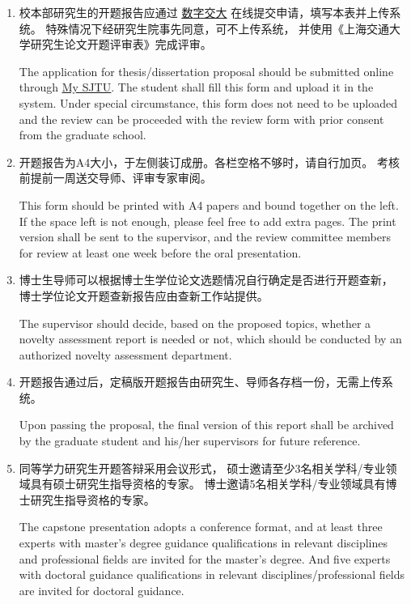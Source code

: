 \documentclass[a4paper,zihao=-4,AutoFakeBold]{ctexart}
\begin{document}
\begin{enumerate}[parsep=.5\baselineskip]
    \fangsong
    \item 校本部研究生的开题报告应通过%
          \href{http://my.sjtu.edu.cn/}{\color{blue}\underline{数字交大}}%
          在线提交申请，填写本表并上传系统。
          特殊情况下经研究生院事先同意，可不上传系统，
          并使用《上海交通大学研究生论文开题评审表》完成评审。
          
          The application for thesis/dissertation proposal
          should be submitted online through
          \href{http://my.sjtu.edu.cn/}{\color{blue}\underline{My SJTU}}.
          The student shall fill this form and upload it in the system.
          Under special circumstance,
          this form does not need to be uploaded
          and the review can be proceeded with the review form
          with prior consent from the graduate school.

    \item 开题报告为A4大小，于左侧装订成册。各栏空格不够时，请自行加页。
          考核前提前一周送交导师、评审专家审阅。

          This form should be printed with A4 papers
          and bound together on the left.
          If the space left is not enough,
          please feel free to add extra pages.
          The print version shall be sent to the supervisor,
          and the review committee members for review
          at least one week before the oral presentation.

    \item 博士生导师可以根据博士生学位论文选题情况自行确定是否进行开题查新，
          博士学位论文开题查新报告应由查新工作站提供。

          The supervisor should decide, based on the proposed topics,
          whether a novelty assessment report is needed or not,
          which should be conducted by an authorized
          novelty assessment department.

    \item 开题报告通过后，定稿版开题报告由研究生、导师各存档一份，无需上传系统。

          Upon passing the proposal,
          the final version of this report shall be archived by the
          graduate student and his/her supervisors for future reference.

    \item 同等学力研究生开题答辩采用会议形式，
          硕士邀请至少3名相关学科/专业领域具有硕士研究生指导资格的专家。
          博士邀请5名相关学科/专业领域具有博士研究生指导资格的专家。

          The capstone presentation adopts a conference format,
          and at least three experts with master's degree guidance
          qualifications in relevant disciplines and professional fields
          are invited for the master's degree.
          And five experts with doctoral guidance qualifications
          in relevant disciplines/professional fields are invited
          for doctoral guidance.
\end{enumerate}
\end{document}
